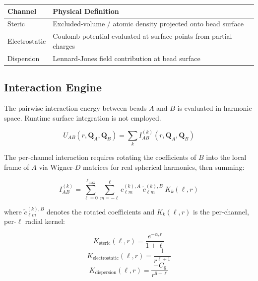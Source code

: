 \documentclass[11pt]{article}
\begin{document}
\begin{center}
\begin{tabular}{ll}
    \textbf{Channel} & \textbf{Physical Definition} \\
    \hline
    Steric        & Excluded-volume / atomic density projected onto bead surface \\
    Electrostatic & Coulomb potential evaluated at surface points from partial charges \\
    Dispersion    & Lennard-Jones field contribution at bead surface \\
\end{tabular}
\end{center}

\subsection{Interaction Engine}

The pairwise interaction energy between beads $A$ and $B$ is evaluated in
harmonic space.  Runtime surface integration is not employed.

\begin{equation}
    U_{AB}(r, \mathbf{Q}_A, \mathbf{Q}_B) = \sum_k I_{AB}^{(k)}(r, \mathbf{Q}_A, \mathbf{Q}_B)
\end{equation}

The per-channel interaction requires rotating the coefficients of $B$ into
the local frame of $A$ via Wigner-$D$ matrices for real spherical harmonics,
then summing:

\begin{equation}
    I_{AB}^{(k)} = \sum_{\ell=0}^{\ell_{\max}} \sum_{m=-\ell}^{\ell}
        c_{\ell m}^{(k),A}\; \tilde{c}_{\ell m}^{(k),B}\; K_k(\ell, r)
\end{equation}

where $\tilde{c}_{\ell m}^{(k),B}$ denotes the rotated coefficients and
$K_k(\ell, r)$ is the per-channel, per-$\ell$ radial kernel:

\begin{equation}
    K_{\mathrm{steric}}(\ell, r) = \frac{e^{-\alpha_s r}}{1 + \ell}
\end{equation}
\begin{equation}
    K_{\mathrm{electrostatic}}(\ell, r) = \frac{1}{r^{\ell+1}}
\end{equation}
\begin{equation}
    K_{\mathrm{dispersion}}(\ell, r) = \frac{-C_6}{r^{6+\ell}}
\end{equation}
\end{document}
